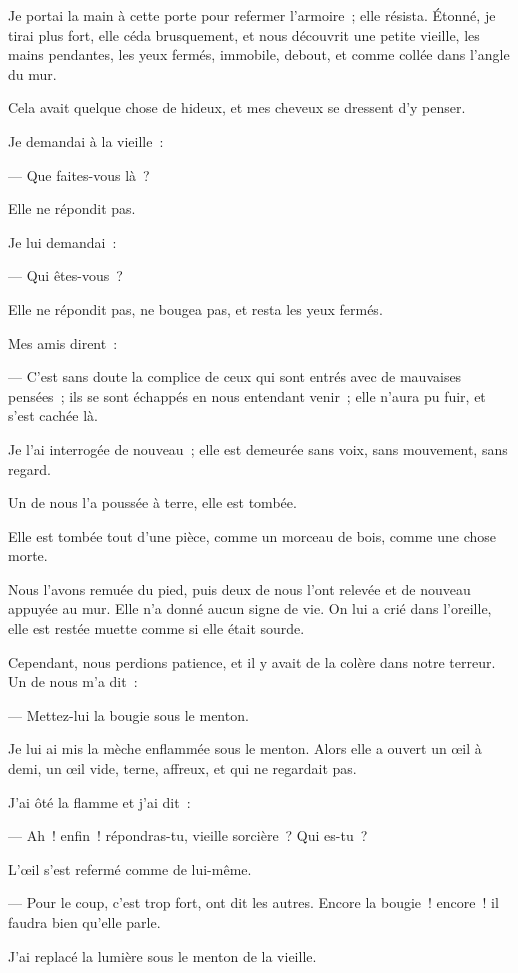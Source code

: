 \documentclass[french,twoside]{book} %
\begin{document}
Je portai la main à cette porte pour refermer l’armoire ; elle résista. Étonné, je tirai plus fort, elle céda brusquement, et nous découvrit une petite vieille, les mains pendantes, les yeux fermés, immobile, debout, et comme collée dans l’angle du mur.\par
Cela avait quelque chose de hideux, et mes cheveux se dressent d’y penser.\par
Je demandai à la vieille :\par
— Que faites-vous là ?\par
Elle ne répondit pas.\par
 Je lui demandai :\par
— Qui êtes-vous ?\par
Elle ne répondit pas, ne bougea pas, et resta les yeux fermés.\par
Mes amis dirent :\par
— C’est sans doute la complice de ceux qui sont entrés avec de mauvaises pensées ; ils se sont échappés en nous entendant venir ; elle n’aura pu fuir, et s’est cachée là.\par
Je l’ai interrogée de nouveau ; elle est demeurée sans voix, sans mouvement, sans regard.\par
Un de nous l’a poussée à terre, elle est tombée.\par
Elle est tombée tout d’une pièce, comme un morceau de bois, comme une chose morte.\par
Nous l’avons remuée du pied, puis deux de nous l’ont relevée et de nouveau appuyée au mur. Elle n’a donné aucun signe de vie. On lui a crié dans l’oreille, elle est restée muette comme si elle était sourde.\par
Cependant, nous perdions patience, et il y avait de la colère dans notre terreur. Un de nous m’a dit :\par
— Mettez-lui la bougie sous le menton.\par
Je lui ai mis la mèche enflammée sous le menton. Alors elle a ouvert un œil à demi, un œil vide, terne, affreux, et qui ne regardait pas.\par
J’ai ôté la flamme et j’ai dit :\par
— Ah ! enfin ! répondras-tu, vieille sorcière ? Qui es-tu ?\par
L’œil s’est refermé comme de lui-même.\par
— Pour le coup, c’est trop fort, ont dit les autres. Encore la bougie ! encore ! il faudra bien qu’elle parle.\par
 J’ai replacé la lumière sous le menton de la vieille.\par
\end{document}
